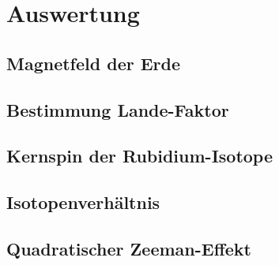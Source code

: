 \section{Auswertung}
\label{sec:auswertung}

\subsection{Magnetfeld der Erde}
\label{sec:magnetfeld-der-erde}

\subsection{Bestimmung Lande-Faktor}
\label{sec:best-lande-faktoren}

\subsection{Kernspin der Rubidium-Isotope}
\label{sec:Kernspin der Rubidium-Isotope}

\subsection{Isotopenverhältnis}
\label{sec:Isotopenverhältnis}

\subsection{Quadratischer Zeeman-Effekt}
\label{sec:quadratischer-zeeman-effekt}